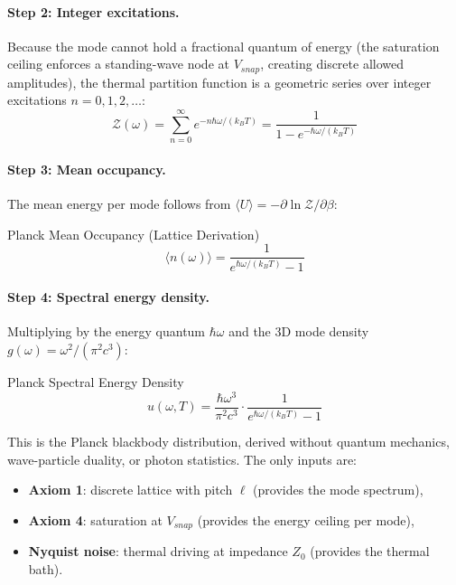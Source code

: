 \paragraph{Step 2: Integer excitations.}
Because the mode cannot hold a fractional quantum of energy (the saturation ceiling enforces a standing-wave node at $V_{snap}$, creating discrete allowed amplitudes), the thermal partition function is a geometric series over integer excitations $n = 0, 1, 2, \ldots$:
\begin{equation}
    \mathcal{Z}(\omega) = \sum_{n=0}^{\infty} e^{-n\hbar\omega / (k_B T)} = \frac{1}{1 - e^{-\hbar\omega / (k_B T)}}
\end{equation}

\paragraph{Step 3: Mean occupancy.}
The mean energy per mode follows from $\langle U \rangle = -\partial \ln \mathcal{Z} / \partial \beta$:
\begin{resultbox}{Planck Mean Occupancy (Lattice Derivation)}
\begin{equation}
    \langle n(\omega) \rangle = \frac{1}{e^{\hbar\omega / (k_B T)} - 1}
    \label{eq:planck_occupancy}
\end{equation}
\end{resultbox}

\paragraph{Step 4: Spectral energy density.}
Multiplying by the energy quantum $\hbar\omega$ and the 3D mode density $g(\omega) = \omega^2 / (\pi^2 c^3)$:
\begin{resultbox}{Planck Spectral Energy Density}
\begin{equation}
    u(\omega, T) = \frac{\hbar \omega^3}{\pi^2 c^3} \cdot \frac{1}{e^{\hbar\omega / (k_B T)} - 1}
    \label{eq:planck_distribution}
\end{equation}
\end{resultbox}

\noindent This is the Planck blackbody distribution, derived without quantum mechanics, wave-particle duality, or photon statistics. The only inputs are:
\begin{itemize}
    \item \textbf{Axiom 1}: discrete lattice with pitch $\ell$ (provides the mode spectrum),
    \item \textbf{Axiom 4}: saturation at $V_{snap}$ (provides the energy ceiling per mode),
    \item \textbf{Nyquist noise}: thermal driving at impedance $Z_0$ (provides the thermal bath).
\end{itemize}

